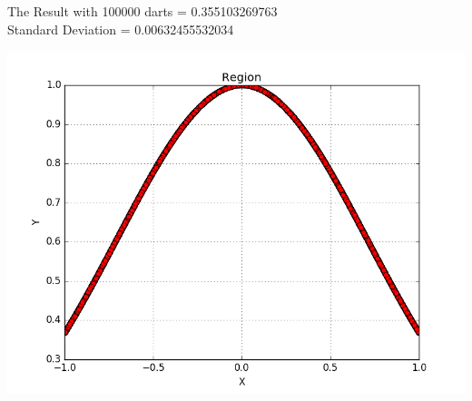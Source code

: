 \documentclass[a4paper]{article}
\begin{document}
The Result with 100000 darts = 0.355103269763 \\
Standard Deviation = 0.00632455532034 \\

\begin{center}

\includegraphics[width=\textwidth]{m1.png}

\end{center}
\end{document}
